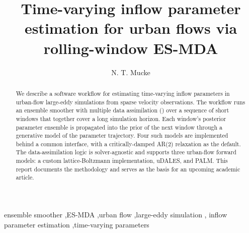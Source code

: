 \documentclass[preprint,12pt]{elsarticle}
\begin{document}
\begin{frontmatter}

\title{Time-varying inflow parameter estimation for urban flows
       via rolling-window ES-MDA}

\author{N. T. Mucke}

\begin{abstract}
We describe a software workflow for estimating time-varying inflow
parameters in urban-flow large-eddy simulations from sparse
velocity observations.  The workflow runs an ensemble smoother with
multiple data assimilation (\ESMDA{}) over a sequence of short
windows that together cover a long simulation horizon.  Each
window's posterior parameter ensemble is propagated into the
prior of the next window through a generative model of the parameter
trajectory.  Four such models are implemented behind a common
interface, with a critically-damped AR(2) relaxation as the default.
The data-assimilation logic is solver-agnostic and supports three
urban-flow forward models: a custom lattice-Boltzmann implementation,
uDALES, and PALM.  This report documents the methodology and serves
as the basis for an upcoming academic article.
\end{abstract}

\begin{keyword}
ensemble smoother \sep ES-MDA \sep urban flow \sep large-eddy simulation \sep
inflow parameter estimation \sep time-varying parameters
\end{keyword}

\end{frontmatter}










\end{document}
